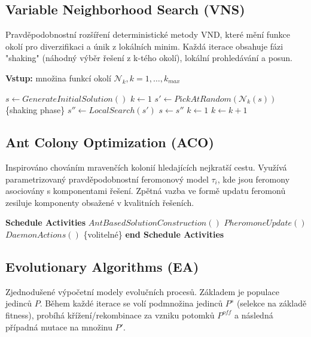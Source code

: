 \documentclass[12pt,a4paper]{article}
\theoremstyle{definition}
\begin{document}
\subsection{Variable Neighborhood Search (VNS)}
Pravděpodobnostní rozšíření deterministické metody VND, které mění funkce okolí pro diverzifikaci a únik z lokálních minim. Každá iterace obsahuje fázi "shaking" (náhodný výběr řešení z k-tého okolí), lokální prohledávání a posun.

\begin{algorithm}[H]
\caption{Variable Neighborhood Search (VNS) }
\textbf{Vstup:} množina funkcí okolí $\mathcal{N}_k, k=1,\dots,k_{max}$ 
\begin{algorithmic}[1]
\STATE $s \gets GenerateInitialSolution()$ 
\STATE $k \gets 1$ 
\STATE $s' \gets PickAtRandom(\mathcal{N}_k(s))$ \{shaking phase\} 
\STATE $s'' \gets LocalSearch(s')$ 
\STATE $s \gets s''$ 
\STATE $k \gets 1$ 
\ELSE
\STATE $k \gets k + 1$ 
\ENDIF
\ENDWHILE
\ENDWHILE
\end{algorithmic}
\end{algorithm}

\subsection{Ant Colony Optimization (ACO)}
Inspirováno chováním mravenčích kolonií hledajících nejkratší cestu. Využívá parametrizovaný pravděpodobnostní feromonový model $\tau_i$, kde jsou feromony asociovány s komponentami řešení. Zpětná vazba ve formě updatu feromonů zesiluje komponenty obsažené v kvalitních řešeních.

\begin{algorithm}[H]
\caption{Ant Colony Optimization (ACO) }
\begin{algorithmic}[1]
\STATE \textbf{Schedule Activities} 
\STATE \quad $AntBasedSolutionConstruction()$ 
\STATE \quad $PheromoneUpdate()$ 
\STATE \quad $DaemonActions()$ \{volitelné\} 
\STATE \textbf{end Schedule Activities} 
\ENDWHILE
\end{algorithmic}
\end{algorithm}

\subsection{Evolutionary Algorithms (EA)}
Zjednodušené výpočetní modely evolučních procesů. Základem je populace jedinců $P$. Během každé iterace se volí podmnožina jedinců $P^s$ (selekce na základě fitness), probíhá křížení/rekombinace za vzniku potomků $P^{off}$ a následná případná mutace na množinu $P'$.
\end{document}
